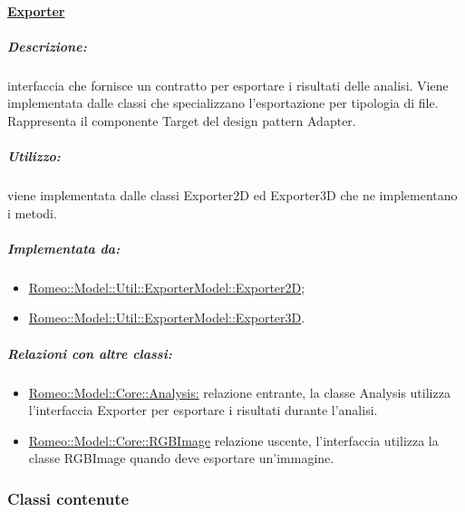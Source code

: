 			\paragraph{\underline{Exporter}}
			\label{expo}
			 	\subparagraph{Descrizione:} interfaccia che fornisce un contratto per esportare i risultati delle analisi. Viene implementata dalle classi che specializzano l'esportazione per tipologia di file.
			 	\\Rappresenta il componente Target del design pattern\g{} Adapter.
			 	\subparagraph{Utilizzo:} viene implementata dalle classi Exporter2D ed Exporter3D che ne implementano i metodi.
			 	\subparagraph{Implementata da:}
					\begin{itemize}
						\item \hyperref[expo_analyze]{Romeo::Model::Util::ExporterModel::Exporter2D};
						\item \hyperref[expo_img]{Romeo::Model::Util::ExporterModel::Exporter3D}.	
					\end{itemize}

				\subparagraph{Relazioni con altre classi:}
					\begin{itemize}
						\item \hyperref[]{Romeo::Model::Core::Analysis:} relazione entrante, la classe Analysis utilizza l'interfaccia Exporter per esportare i risultati durante l'analisi.
						\item \hyperref[]{Romeo::Model::Core::RGBImage} relazione uscente, l'interfaccia utilizza la classe RGBImage quando deve esportare un'immagine.
					\end{itemize}

		\subsubsection{Classi contenute}
		\label{exporter_contenute}
